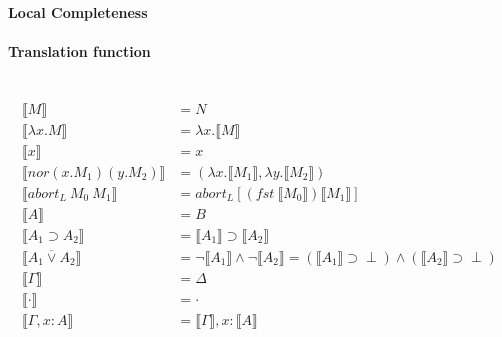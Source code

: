 \documentclass[12 pt]{article}
\begin{document}
\paragraph{Local Completeness}
\begin{center}
\end{center}
\paragraph{Translation function}~
\begin{align*}
	\llbracket M \rrbracket & = N
	\\ \llbracket \lambda x. M \rrbracket & = \lambda x. \llbracket M \rrbracket
	\\ \llbracket x \rrbracket & = x
	\\ \llbracket nor (x.M_1) (y.M_2) \rrbracket & = (\lambda x. \llbracket M_1 \rrbracket, \lambda y.\llbracket M_2 \rrbracket)
	\\ \llbracket abort_L\ M_0\ M_1 \rrbracket & = abort_L [(fst\ \llbracket M_0 \rrbracket)\llbracket M_1 \rrbracket]
	\\ \llbracket A \rrbracket & = B
	\\ \llbracket A_1 \supset A_2 \rrbracket & = \llbracket A_1 \rrbracket \supset \llbracket A_2 \rrbracket
	\\ \llbracket A_1 \overline{\lor} A_2 \rrbracket & = \neg \llbracket A_1 \rrbracket \land \neg \llbracket A_2 \rrbracket = (\llbracket A_1 \rrbracket \supset \perp) \land (\llbracket A_2 \rrbracket \supset \perp)
	\\ \llbracket \Gamma \rrbracket & = \Delta
	\\ \llbracket \cdot \rrbracket & = \cdot
	\\ \llbracket \Gamma, x:A \rrbracket & = \llbracket \Gamma \rrbracket, x:\llbracket A \rrbracket
\end{align*}
\end{document}
